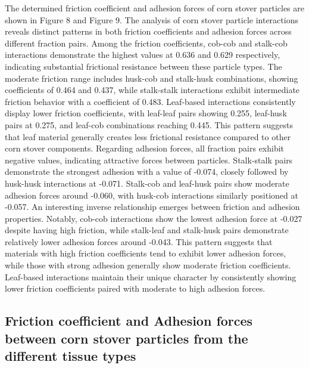 \documentclass[xcolor=dvipsnames,10pt,hidelinks]{article}
\let\oldsubsection\subsection
\renewcommand{\subsection}{\clearpage\oldsubsection}
\begin{document}
The determined friction coefficient and adhesion forces of corn stover particles are shown in Figure 8 and Figure 9. The analysis of corn stover particle interactions reveals distinct patterns in both friction coefficients and adhesion forces across different fraction pairs. Among the friction coefficients, cob-cob and stalk-cob interactions demonstrate the highest values at 0.636 and 0.629 respectively, indicating substantial frictional resistance between these particle types. The moderate friction range includes husk-cob and stalk-husk combinations, showing coefficients of 0.464 and 0.437, while stalk-stalk interactions exhibit intermediate friction behavior with a coefficient of 0.483.
Leaf-based interactions consistently display lower friction coefficients, with leaf-leaf pairs showing 0.255, leaf-husk pairs at 0.275, and leaf-cob combinations reaching 0.445. This pattern suggests that leaf material generally creates less frictional resistance compared to other corn stover components.
Regarding adhesion forces, all fraction pairs exhibit negative values, indicating attractive forces between particles. Stalk-stalk pairs demonstrate the strongest adhesion with a value of -0.074, closely followed by husk-husk interactions at -0.071. Stalk-cob and leaf-husk pairs show moderate adhesion forces around -0.060, with husk-cob interactions similarly positioned at -0.057.
An interesting inverse relationship emerges between friction and adhesion properties. Notably, cob-cob interactions show the lowest adhesion force at -0.027 despite having high friction, while stalk-leaf and stalk-husk pairs demonstrate relatively lower adhesion forces around -0.043. This pattern suggests that materials with high friction coefficients tend to exhibit lower adhesion forces, while those with strong adhesion generally show moderate friction coefficients. Leaf-based interactions maintain their unique character by consistently showing lower friction coefficients paired with moderate to high adhesion forces.

\newpage
\subsection{Friction coefficient and Adhesion forces between corn stover particles from the different tissue types}
\label{sec:org16f7ca5}
\end{document}
